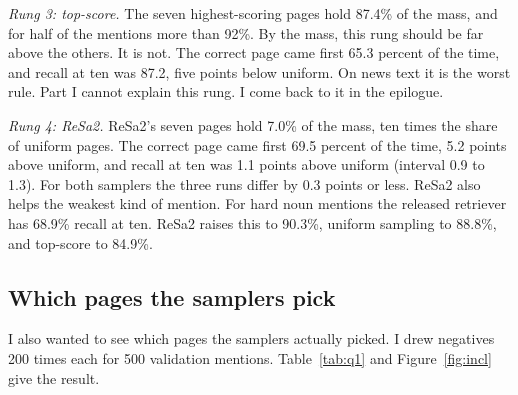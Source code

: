 \documentclass[11pt]{article}
\theoremstyle{definition}
\begin{document}
\emph{Rung 3: top-score.} The seven highest-scoring pages hold 87.4\% of the mass, and for half of the mentions more than 92\%. By the mass, this rung should be far above the others. It is not. The correct page came first 65.3 percent of the time, and recall at ten was 87.2, five points below uniform. On news text it is the worst rule. Part I cannot explain this rung. I come back to it in the epilogue.

\emph{Rung 4: ReSa2.} ReSa2's seven pages hold 7.0\% of the mass, ten times the share of uniform pages. The correct page came first 69.5 percent of the time, 5.2 points above uniform, and recall at ten was 1.1 points above uniform (interval 0.9 to 1.3). For both samplers the three runs differ by 0.3 points or less. ReSa2 also helps the weakest kind of mention. For hard noun mentions the released retriever has 68.9\% recall at ten. ReSa2 raises this to 90.3\%, uniform sampling to 88.8\%, and top-score to 84.9\%.

\subsection{Which pages the samplers pick}
\label{sec:picks}

I also wanted to see which pages the samplers actually picked. I drew negatives 200 times each for 500 validation mentions. Table~\ref{tab:q1} and Figure~\ref{fig:incl} give the result.
\end{document}
